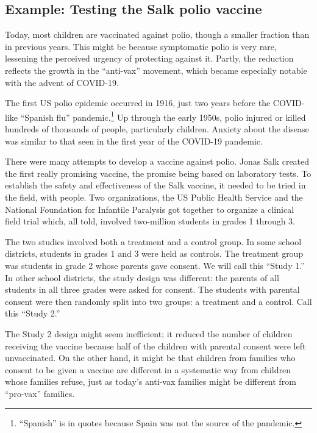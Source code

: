 \documentclass[
  letterpaper,
  DIV=11,
  numbers=noendperiod,
  oneside]{scrreprt}
\begin{document}
{\begin{footnotesize}
\hypertarget{example-testing-the-salk-polio-vaccine}{%
\section{Example: Testing the Salk polio
vaccine}\label{example-testing-the-salk-polio-vaccine}}

Today, most children are vaccinated against polio, though a smaller
fraction than in previous years. This might be because symptomatic polio
is very rare, lessening the perceived urgency of protecting against it.
Partly, the reduction reflects the growth in the ``anti-vax'' movement,
which became especially notable with the advent of COVID-19.

The first US polio epidemic occurred in 1916, just two years before the
COVID-like ``Spanish flu'' pandemic.\footnote{``Spanish'' is in quotes
  because Spain was not the source of the pandemic.} Up through the
early 1950s, polio injured or killed hundreds of thousands of people,
particularly children. Anxiety about the disease was similar to that
seen in the first year of the COVID-19 pandemic.

There were many attempts to develop a vaccine against polio. Jonas Salk
created the first really promising vaccine, the promise being based on
laboratory tests. To establish the safety and effectiveness of the Salk
vaccine, it needed to be tried in the field, with people. Two
organizations, the US Public Health Service and the National Foundation
for Infantile Paralysis got together to organize a clinical field trial
which, all told, involved two-million students in grades 1 through 3.

The two studies involved both a treatment and a control group. In some
school districts, students in grades 1 and 3 were held as controls. The
treatment group was students in grade 2 whose parents gave consent. We
will call this ``Study 1.'' In other school districts, the study design
was different: the parents of all students in all three grades were
asked for consent. The students with parental consent were then randomly
split into two groups: a treatment and a control. Call this ``Study 2.''

The Study 2 design might seem inefficient; it reduced the number of
children receiving the vaccine because half of the children with
parental consent were left unvaccinated. On the other hand, it might be
that children from families who consent to be given a vaccine are
different in a systematic way from children whose families refuse, just
as today's anti-vax families might be different from ``pro-vax''
families.


\end{footnotesize}}
\end{document}
